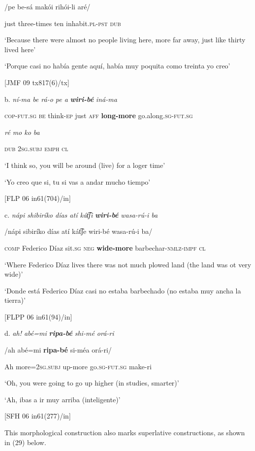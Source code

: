 /pe  be-sá    makói  rihói-li    aré/

just   three-times  ten  inhabit.\textsc{pl-pst  dub}

‘Because there were almost no people living here, more far away, just like thirty lived here’

‘Porque casi no había gente aquí, había muy poquita como treinta yo creo’

[JMF 09 tx817(6)/tx]

 b.  \textit{ní-ma     be  rá-o     pe   a} \textbf{\textit{wiri-bé}} \textit{iná-ma} 

\textsc{cop-fut.sg  be} think-\textsc{ep} just  \textsc{aff} \textbf{long-more}  go.along\textsc{.sg-fut.sg} 

\textit{ré  mo     ko   ba} 

\textsc{dub  2sg.subj  emph  cl}

  ‘I think so, you will be around (live) for a loger time’

‘Yo creo que si, tu si vas a andar mucho tiempo’

  [FLP 06 in61(704)/in]

c.  \textit{nápi   shibiríko   días   atí   kát͡ʃi} \textbf{\textit{wiri-bé} } \textit{wasa-rú}\textit{{}-i     ba}

  /nápi  sibiríko  días  atí  kát͡ʃe  wiri-bé    wasa-rú-i    ba/

\textsc{comp}  Federico  Díaz  sit.\textsc{sg}  \textsc{neg} \textbf{wide\textsc{{}-}}\textbf{more} barbechar-\textsc{nmlz-impf}  \textsc{cl}

  ‘Where Federico Díaz lives there was not much plowed land (the land was ot very wide)’

‘Donde está Federico Díaz casi no estaba barbechado (no estaba muy ancha la tierra)’

  [FLPP 06 in61(94)/in]

d.   \textit{ah!   abé=mi} \textbf{\textit{ripa-bé}} \textit{shi-mé     orá-ri}

  /ah  abé=mi    \textbf{ripa-bé}  si-méa    orá-ri/

Ah  more=2\textsc{sg.subj}  up-more  go.\textsc{sg}{}-\textsc{fut.sg}  make-ri

  ‘Oh, you were going to go up higher (in studies, smarter)’

‘Ah, ibas a ir muy arriba (inteligente)’  

  [SFH 06 in61(277)/in]

This morphological construction also marks superlative constructions, as shown in (29) below.

